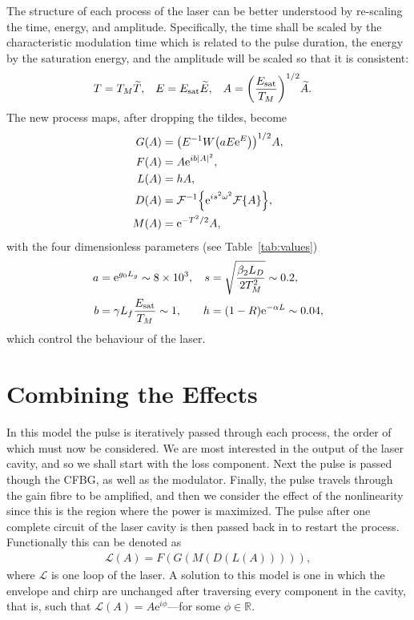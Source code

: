 The structure of each process of the laser can be better understood by re-scaling the time, energy, and amplitude. Specifically, the time shall be scaled by the characteristic modulation time which is related to the pulse duration, the energy by the saturation energy, and the amplitude will be scaled so that it is consistent:
\begin{align*}
	T &= T_M \widetilde{T},& E &= \Es \widetilde{E},& A &= \left( \frac{\Es}{T_M} \right)^{1/2} \widetilde{A}.
\end{align*}
The new process maps, after dropping the tildes, become
\begin{subequations}
\label{eq:effects}
\begin{align}
\label{eq:gain}
G(A) &= \left(E^{-1} W \left( a E \textrm{e}^{E}\right) \right)^{1/2} A, \\
\label{eq:fibre}
F(A) &= A \textrm{e}^{i b |A|^2}, \\
\label{eq:loss}
L(A) &= h A, \\
\label{eq:disp}
D(A) &= \FTi{\textrm{e}^{i s^2 \omega^2} \FT{A}}, \\
\label{eq:mod}
M(A) &= \textrm{e}^{-T^2 / 2} A,
\end{align}
\end{subequations}
with the four dimensionless parameters (see Table~\ref{tab:values})
\begin{align*}
	a &= \textrm{e}^{g_0 L_g} \sim 8 \times 10^3,& s &= \sqrt{\frac{\beta_2 L_D}{2 T_M^2}} \sim 0.2, \\
	b &= \gamma L_f \frac{E_{\textrm{sat}}}{T_M} \sim 1,& h &= (1 - R) \textrm{e}^{-\alpha L} \sim 0.04,
\end{align*}
which control the behaviour of the laser.

\section{Combining the Effects}
\label{sec:effects}
In this model the pulse is iteratively passed through each process, the order of which must now be considered. We are most interested in the output of the laser cavity, and so we shall start with the loss component. Next the pulse is passed though the CFBG, as well as the modulator. Finally, the pulse travels through the gain fibre to be amplified, and then we consider the effect of the nonlinearity since this is the region where the power is maximized. The pulse after one complete circuit of the laser cavity is then passed back in to restart the process. Functionally this can be denoted as
\begin{align*}
	\mathcal{L}(A) = F(G(M(D(L(A))))),
\end{align*}
where $\mathcal{L}$ is one loop of the laser. A solution to this model is one in which the envelope and chirp are unchanged after traversing every component in the cavity, that is, such that $\mathcal{L}(A) = A \textrm{e}^{i \phi}$---for some $\phi \in \mathbb{R}$.

